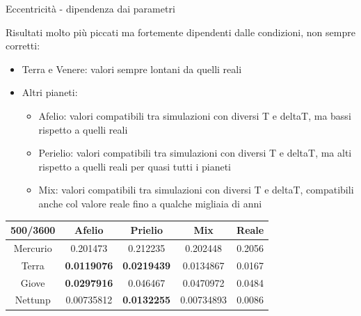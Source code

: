         \begin{frame}{Eccentricità - dipendenza dai parametri}
            \begin{block}{Risultati molto più piccati ma fortemente dipendenti dalle condizioni, non sempre corretti:}
                \begin{itemize}
                    \item Terra e Venere: valori sempre lontani da quelli reali
                    \item Altri pianeti:
                    \begin{itemize}
                        \item Afelio: valori compatibili tra simulazioni con diversi T e deltaT, ma bassi rispetto a quelli reali
                        \item Perielio: valori compatibili tra simulazioni con diversi T e deltaT, ma alti rispetto a quelli reali per quasi tutti i pianeti
                        \item Mix: valori compatibili tra simulazioni con diversi T e deltaT, compatibili anche col valore reale fino a qualche migliaia di anni
                    \end{itemize}
                \end{itemize}               
            \end{block}
            \begin{table}[]
                \centering
                \begin{tabular}{c|ccc|c}
                    500/3600 & Afelio & Prielio & Mix & Reale \\
                    \hline
                    Mercurio & 0.201473 & 0.212235 & 0.202448 & 0.2056 \\
                    Terra & \textbf{0.0119076} &\textbf{ 0.0219439} & 0.0134867 & 0.0167 \\
                    Giove & \textbf{0.0297916} & 0.046467 & 0.0470972 & 0.0484 \\
                    Nettunp & 0.00735812 & \textbf{0.0132255} & 0.00734893 & 0.0086 \\
                \end{tabular}
                \label{tab:ecce}
            \end{table}
        \end{frame}
